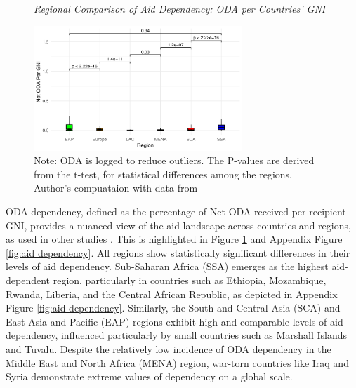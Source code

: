 


\begin{figure}[ht]
\captionsetup{justification=justified,singlelinecheck=false}
\caption{\textit{Regional Comparison of Aid Dependency: ODA per Countries' GNI}}
    \centering \includegraphics[width = 0.7\textwidth]{Figures/ODA_Graphs/ODA_GNI_boxplt.pdf}
    \caption*{\footnotesize{Note: ODA is logged to reduce outliers. The P-values are derived from the t-test, for statistical differences among the regions. Author's compuataion with data from \textcite{oecd_Data_2023}}}
    \label{fig:ODA Dependency by region}
\end{figure}

ODA dependency, defined as the percentage of Net ODA received per recipient GNI, provides a nuanced view of the aid landscape across countries and regions, as used in other studies \textcite{temple_aid_2010}. This is highlighted in Figure \ref{fig:ODA Dependency by region} and Appendix Figure \ref{fig:aid dependency}. All regions show statistically significant differences in their levels of aid dependency. Sub-Saharan Africa (SSA) emerges as the highest aid-dependent region, particularly in countries such as Ethiopia, Mozambique, Rwanda, Liberia, and the Central African Republic, as depicted in Appendix Figure \ref{fig:aid dependency}. Similarly, the South and Central Asia (SCA) and East Asia and Pacific (EAP) regions exhibit high and comparable levels of aid dependency, influenced particularly by small countries such as Marshall Islands and Tuvalu. Despite the relatively low incidence of ODA dependency in the Middle East and North Africa (MENA) region, war-torn countries like Iraq and Syria demonstrate extreme values of dependency on a global scale.



